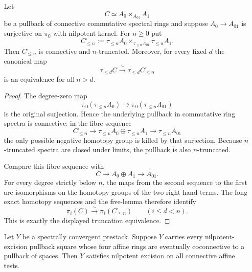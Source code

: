 \begin{lemma}
\label{lem:bnli-postnikov-nilpotent-pullback}
Let
\[
    C\simeq A_0\times_{A_{01}}A_1
\]
be a pullback of connective commutative spectral rings and suppose
$A_0\to A_{01}$ is surjective on $\pi_0$ with nilpotent kernel.  For
$n\geq0$ put
\[
\boxed{
    C^{\square}_{\leq n}
    :=
    \tau_{\leq n}A_0
    \times_{\tau_{\leq n}A_{01}}
    \tau_{\leq n}A_1.}
\]
Then $C^{\square}_{\leq n}$ is connective and $n$-truncated.  Moreover, for
every fixed $d$ the canonical map
\[
\boxed{
    \tau_{\leq d}C
    \xrightarrow{\sim}
    \tau_{\leq d}C^{\square}_{\leq n}}
\]
is an equivalence for all $n>d$.
\end{lemma}

\begin{proof}
The degree-zero map
\[
    \pi_0(\tau_{\leq n}A_0)
    \longrightarrow
    \pi_0(\tau_{\leq n}A_{01})
\]
is the original surjection.  Hence the underlying pullback in commutative ring
spectra is connective: in the fibre sequence
\[
    C^{\square}_{\leq n}
    \longrightarrow
    \tau_{\leq n}A_0\oplus\tau_{\leq n}A_1
    \longrightarrow
    \tau_{\leq n}A_{01}
\]
the only possible negative homotopy group is killed by that surjection.
Because $n$-truncated spectra are closed under limits, the pullback is also
$n$-truncated.

Compare this fibre sequence with
\[
    C\longrightarrow A_0\oplus A_1\longrightarrow A_{01}.
\]
For every degree strictly below $n$, the maps from the second sequence to the
first are isomorphisms on the homotopy groups of the two right-hand terms.
The long exact homotopy sequences and the five-lemma therefore identify
\[
    \pi_i(C)\xrightarrow{\sim}
    \pi_i(C^{\square}_{\leq n})
    \qquad(i\leq d<n).
\]
This is exactly the displayed truncation equivalence.
\end{proof}

\begin{lemma}
\label{lem:bnli-convergent-excision-extension}
Let $Y$ be a spectrally convergent prestack.  Suppose $Y$ carries every
nilpotent-excision pullback square whose four affine rings are eventually
coconnective to a pullback of spaces.  Then $Y$ satisfies nilpotent excision
on all connective affine tests.
\end{lemma}

